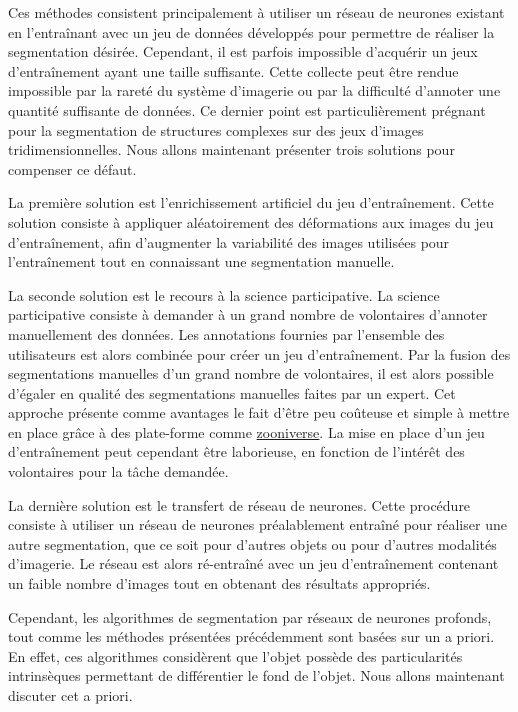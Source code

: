 \documentclass[\main/main.tex]{subfiles}
\begin{document}
%
Ces méthodes consistent principalement à utiliser un réseau de neurones existant
en l'entraînant avec un jeu de données développés pour permettre de réaliser la segmentation désirée.
%
Cependant, il est parfois impossible d'acquérir un jeux d'entraînement ayant une taille suffisante.
%
Cette collecte peut être rendue impossible par la rareté du système d'imagerie ou par la difficulté d'annoter une quantité suffisante de données.
%
Ce dernier point est particulièrement prégnant pour la segmentation de structures complexes sur des jeux d'images tridimensionnelles.
%
Nous allons maintenant présenter trois solutions pour compenser ce défaut.

%
La première solution est l'enrichissement artificiel du jeu d'entraînement\cite{milletari_2016,zhao_2019b,majurski_2019}.
%
Cette solution consiste à appliquer aléatoirement des déformations aux images du jeu d'entraînement,
afin d'augmenter la variabilité des images utilisées pour l'entraînement tout en connaissant une segmentation manuelle.

%
La seconde solution est le recours à la science participative\cite{willi_2019,keshavan_2019}.
%
La science participative consiste à demander à un grand nombre de volontaires d'annoter manuellement des données.
%
Les annotations fournies par l'ensemble des utilisateurs est alors combinée pour créer un jeu d'entraînement.
%
Par la fusion des segmentations manuelles d'un grand nombre de volontaires,
il est alors possible d'égaler en qualité des segmentations manuelles faites par un expert\cite{meakin_2019}.
%
Cet approche présente comme avantages le fait d'être peu coûteuse et simple à mettre en place grâce à des plate\hyp{}forme comme \href{https://www.zooniverse.org/}{zooniverse}.
%
La mise en place d'un jeu d'entraînement peut cependant être laborieuse,
en fonction de l'intérêt des volontaires pour la tâche demandée.

%
La dernière solution est le transfert de réseau de neurones.
%
Cette procédure consiste à utiliser un réseau de neurones préalablement entraîné pour réaliser une autre segmentation, que ce soit pour d'autres objets\cite{wahab_2019} ou pour d'autres modalités d'imagerie\cite{guo_2019}.
%
Le réseau est alors ré\hyp{}entraîné avec un jeu d'entraînement contenant un faible nombre d'images tout en obtenant des résultats appropriés.

Cependant, les algorithmes de segmentation par réseaux de neurones profonds, tout comme les méthodes présentées précédemment sont basées sur un a priori.
%
En effet, ces algorithmes considèrent que l'objet possède des particularités intrinsèques permettant de différentier le fond de l'objet.
%
Nous allons maintenant discuter cet a priori.
\end{document}
